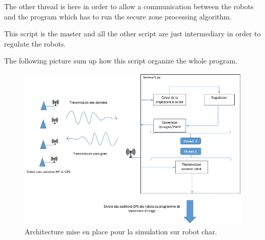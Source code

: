 The other thread is here in order to allow a communication between the robots and the program which has to run the secure zone processing algorithm.

This script is the master and all the other script are just intermediary in order to regulate the robots. 

\medskip

The following picture sum up how this script organize the whole program.

\begin{figure}[ht]
\centering
    \includegraphics[scale=0.8,angle=0]{SyntheseExp.PNG}
    \caption{Architecture mise en place pour la simulation sur robot char.}
    \label{fig:SyntheseExp}
\end{figure}

\pagebreak